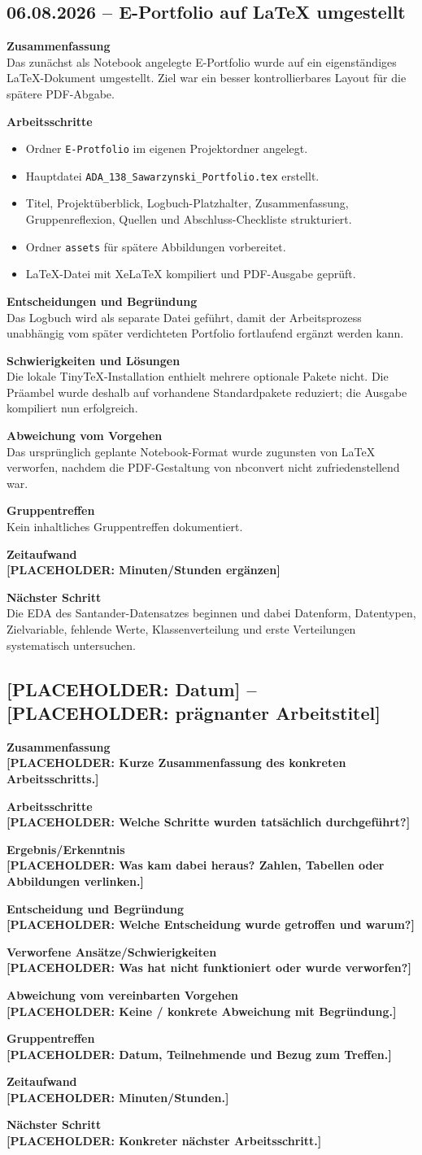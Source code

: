 \documentclass[11pt,a4paper]{article}
\newcommand{\placeholder}[1]{\textcolor{ADAgold}{\textbf{[PLACEHOLDER: #1]}}}
\newcommand{\logsection}[2]{\subsection*{#1 -- #2}}
\newcommand{\field}[2]{\noindent\textbf{#1}\\#2\par\medskip}
\providecommand{\placeholder}[1]{\textcolor{ADAgold}{\textbf{[PLACEHOLDER: #1]}}}
\providecommand{\logsection}[2]{\subsection*{#1 -- #2}}
\providecommand{\field}[2]{\noindent\textbf{#1}\\#2\par\medskip}
\begin{document}
\logsection{06.08.2026}{E-Portfolio auf LaTeX umgestellt}
\field{Zusammenfassung}{Das zunächst als Notebook angelegte E-Portfolio wurde auf ein eigenständiges
LaTeX-Dokument umgestellt. Ziel war ein besser kontrollierbares Layout für die spätere PDF-Abgabe.}
\field{Arbeitsschritte}{
\begin{itemize}
  \item Ordner \texttt{E-Protfolio} im eigenen Projektordner angelegt.
  \item Hauptdatei \texttt{ADA\_138\_Sawarzynski\_Portfolio.tex} erstellt.
  \item Titel, Projektüberblick, Logbuch-Platzhalter, Zusammenfassung, Gruppenreflexion,
        Quellen und Abschluss-Checkliste strukturiert.
  \item Ordner \texttt{assets} für spätere Abbildungen vorbereitet.
  \item LaTeX-Datei mit XeLaTeX kompiliert und PDF-Ausgabe geprüft.
\end{itemize}}
\field{Entscheidungen und Begründung}{Das Logbuch wird als separate Datei geführt, damit der
Arbeitsprozess unabhängig vom später verdichteten Portfolio fortlaufend ergänzt werden kann.}
\field{Schwierigkeiten und Lösungen}{Die lokale TinyTeX-Installation enthielt mehrere optionale
Pakete nicht. Die Präambel wurde deshalb auf vorhandene Standardpakete reduziert; die Ausgabe
kompiliert nun erfolgreich.}
\field{Abweichung vom Vorgehen}{Das ursprünglich geplante Notebook-Format wurde zugunsten von
LaTeX verworfen, nachdem die PDF-Gestaltung von nbconvert nicht zufriedenstellend war.}
\field{Gruppentreffen}{Kein inhaltliches Gruppentreffen dokumentiert.}
\field{Zeitaufwand}{\placeholder{Minuten/Stunden ergänzen}}
\field{Nächster Schritt}{Die EDA des Santander-Datensatzes beginnen und dabei Datenform, Datentypen,
Zielvariable, fehlende Werte, Klassenverteilung und erste Verteilungen systematisch untersuchen.}

\logsection{\placeholder{Datum}}{\placeholder{prägnanter Arbeitstitel}}
\field{Zusammenfassung}{\placeholder{Kurze Zusammenfassung des konkreten Arbeitsschritts.}}
\field{Arbeitsschritte}{\placeholder{Welche Schritte wurden tatsächlich durchgeführt?}}
\field{Ergebnis/Erkenntnis}{\placeholder{Was kam dabei heraus? Zahlen, Tabellen oder Abbildungen verlinken.}}
\field{Entscheidung und Begründung}{\placeholder{Welche Entscheidung wurde getroffen und warum?}}
\field{Verworfene Ansätze/Schwierigkeiten}{\placeholder{Was hat nicht funktioniert oder wurde verworfen?}}
\field{Abweichung vom vereinbarten Vorgehen}{\placeholder{Keine / konkrete Abweichung mit Begründung.}}
\field{Gruppentreffen}{\placeholder{Datum, Teilnehmende und Bezug zum Treffen.}}
\field{Zeitaufwand}{\placeholder{Minuten/Stunden.}}
\field{Nächster Schritt}{\placeholder{Konkreter nächster Arbeitsschritt.}}
\end{document}
